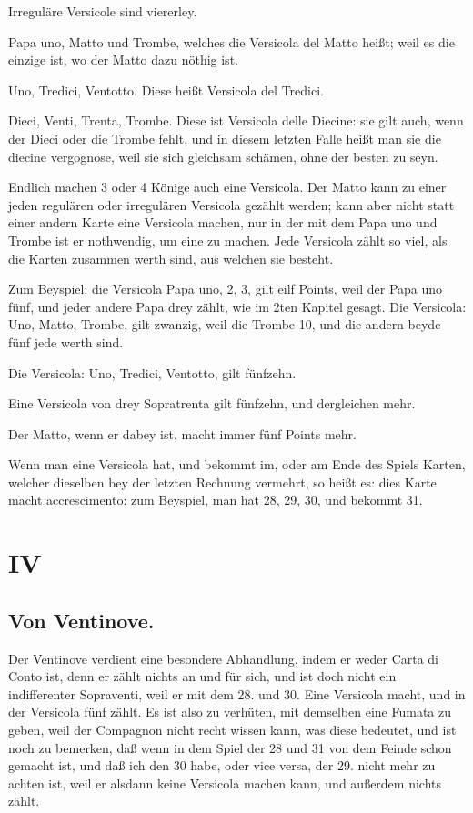 \documentclass[11pt,a6paper,twoside]{article}
\begin{document}
Irreguläre Versicole sind viererley.

Papa uno, Matto und Trombe, welches die Versicola del Matto heißt; weil es die einzige ist, wo der Matto dazu nöthig ist.

Uno, Tredici, Ventotto. Diese heißt Versicola del Tredici.

Dieci, Venti, Trenta, Trombe. Diese ist Versicola delle Diecine: sie gilt auch, wenn der Dieci oder die Trombe fehlt, und in diesem letzten Falle heißt man sie die diecine vergognose, weil sie sich gleichsam schämen, ohne der besten zu seyn.

Endlich machen 3 oder 4 Könige auch eine Versicola. Der Matto kann zu einer jeden regulären oder irregulären Versicola gezählt werden; kann aber nicht statt einer andern Karte eine Versicola machen, nur in der mit dem Papa uno und Trombe ist er nothwendig, um eine zu machen. Jede Versicola zählt so viel, als die Karten zusammen werth sind, aus welchen sie besteht.

Zum Beyspiel: die Versicola Papa uno, 2, 3, gilt eilf Points, weil der Papa uno fünf, und jeder andere Papa drey zählt, wie im 2ten Kapitel gesagt. Die Versicola: Uno, Matto, Trombe, gilt zwanzig, weil die Trombe 10, und die andern beyde fünf jede werth sind.

Die Versicola: Uno, Tredici, Ventotto, gilt fünfzehn.

Eine Versicola von drey Sopratrenta gilt fünfzehn, und dergleichen mehr.

Der Matto, wenn er dabey ist, macht immer fünf Points mehr.

Wenn man eine Versicola hat, und bekommt im, oder am Ende des Spiels Karten, welcher dieselben bey der letzten Rechnung vermehrt, so heißt es: dies Karte macht accrescimento: zum Beyspiel, man hat 28, 29, 30, und bekommt 31.

\section{IV}
\subsection{Von Ventinove.}

Der Ventinove verdient eine besondere Abhandlung, indem er weder Carta di Conto ist, denn er zählt nichts an und für sich, und ist doch nicht ein indifferenter Sopraventi, weil er mit dem 28. und 30. Eine Versicola macht, und in der Versicola fünf zählt. Es ist also zu verhüten, mit demselben eine Fumata zu geben, weil der Compagnon nicht recht wissen kann, was diese bedeutet, und ist noch zu bemerken, daß wenn in dem Spiel der 28 und 31 von dem Feinde schon gemacht ist, und daß ich den 30 habe, oder vice versa, der 29. nicht mehr zu achten ist, weil er alsdann keine Versicola machen kann, und außerdem nichts zählt.
\end{document}
